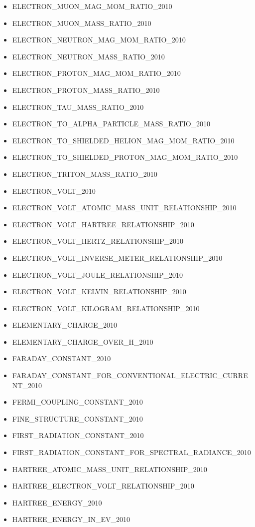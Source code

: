 \begin{itemize}
\item ELECTRON\_MUON\_MAG\_MOM\_RATIO\_2010
\item ELECTRON\_MUON\_MASS\_RATIO\_2010
\item ELECTRON\_NEUTRON\_MAG\_MOM\_RATIO\_2010
\item ELECTRON\_NEUTRON\_MASS\_RATIO\_2010
\item ELECTRON\_PROTON\_MAG\_MOM\_RATIO\_2010
\item ELECTRON\_PROTON\_MASS\_RATIO\_2010
\item ELECTRON\_TAU\_MASS\_RATIO\_2010
\item ELECTRON\_TO\_ALPHA\_PARTICLE\_MASS\_RATIO\_2010
\item ELECTRON\_TO\_SHIELDED\_HELION\_MAG\_MOM\_RATIO\_2010
\item ELECTRON\_TO\_SHIELDED\_PROTON\_MAG\_MOM\_RATIO\_2010
\item ELECTRON\_TRITON\_MASS\_RATIO\_2010
\item ELECTRON\_VOLT\_2010
\item ELECTRON\_VOLT\_ATOMIC\_MASS\_UNIT\_RELATIONSHIP\_2010
\item ELECTRON\_VOLT\_HARTREE\_RELATIONSHIP\_2010
\item ELECTRON\_VOLT\_HERTZ\_RELATIONSHIP\_2010
\item ELECTRON\_VOLT\_INVERSE\_METER\_RELATIONSHIP\_2010
\item ELECTRON\_VOLT\_JOULE\_RELATIONSHIP\_2010
\item ELECTRON\_VOLT\_KELVIN\_RELATIONSHIP\_2010
\item ELECTRON\_VOLT\_KILOGRAM\_RELATIONSHIP\_2010
\item ELEMENTARY\_CHARGE\_2010
\item ELEMENTARY\_CHARGE\_OVER\_H\_2010
\item FARADAY\_CONSTANT\_2010
\item FARADAY\_CONSTANT\_FOR\_CONVENTIONAL\_ELECTRIC\_CURRENT\_2010
\item FERMI\_COUPLING\_CONSTANT\_2010
\item FINE\_STRUCTURE\_CONSTANT\_2010
\item FIRST\_RADIATION\_CONSTANT\_2010
\item FIRST\_RADIATION\_CONSTANT\_FOR\_SPECTRAL\_RADIANCE\_2010
\item HARTREE\_ATOMIC\_MASS\_UNIT\_RELATIONSHIP\_2010
\item HARTREE\_ELECTRON\_VOLT\_RELATIONSHIP\_2010
\item HARTREE\_ENERGY\_2010
\item HARTREE\_ENERGY\_IN\_EV\_2010

\end{itemize}
